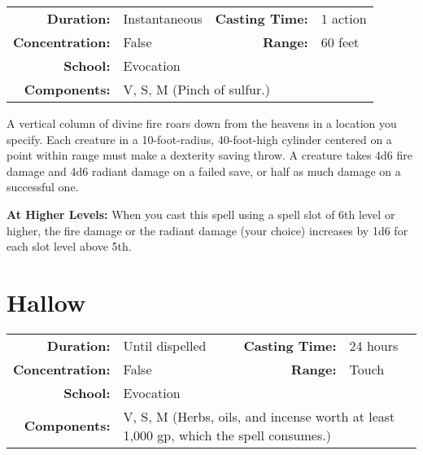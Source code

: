 \documentclass[a5paper, 12pt]{memoir}
\begin{document}
{
\small\centering\vspace{-6pt}
\begin{tabular}{rlrl}
\toprule

\textbf{Duration:} & Instantaneous &
\textbf{Casting Time:} & 1 action \\
\textbf{Concentration:} & False &
\textbf{Range:} & 60 feet \\
\textbf{School:} & Evocation \\
\textbf{Components:} & \multicolumn{3}{p{0.7\textwidth}}{V, S, M (Pinch of sulfur.)}\\

\bottomrule
\end{tabular}
}

\vspace{1\baselineskip}\noindent A vertical column of divine fire roars down from the heavens in a location you specify. Each creature in a 10-foot-radius, 40-foot-high cylinder centered on a point within range must make a dexterity saving throw. A creature takes 4d6 fire damage and 4d6 radiant damage on a failed save, or half as much damage on a successful one.

\vspace{8pt} \noindent\textbf{At Higher Levels:} When you cast this spell using a spell slot of 6th level or higher, the fire damage or the radiant damage (your choice) increases by 1d6 for each slot level above 5th.
\newpage
\section*{Hallow}

{
\small\centering\vspace{-6pt}
\begin{tabular}{rlrl}
\toprule

\textbf{Duration:} & Until dispelled &
\textbf{Casting Time:} & 24 hours \\
\textbf{Concentration:} & False &
\textbf{Range:} & Touch \\
\textbf{School:} & Evocation \\
\textbf{Components:} & \multicolumn{3}{p{0.7\textwidth}}{V, S, M (Herbs, oils, and incense worth at least 1,000 gp, which the spell consumes.)}\\

\bottomrule
\end{tabular}
}
\end{document}
